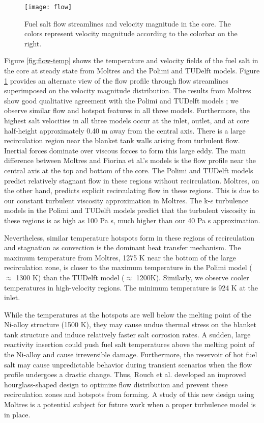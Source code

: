 \begin{figure}[t!]
    \centering
    \texttt{[image: flow]}
    \caption{Fuel salt flow streamlines and velocity magnitude in the core.
    The colors represent velocity magnitude according to the colorbar on the
    right.}
    \label{fig:flow}
\end{figure}

Figure \ref{fig:flow-temp} shows the temperature and velocity fields of the
fuel salt in the core at steady state from Moltres and the Polimi and TUDelft
models. Figure \ref{fig:flow} provides an alternate view of the flow profile
through flow streamlines superimposed on the velocity magnitude distribution.
The results from Moltres show good qualitative agreement with the
Polimi and TUDelft models \cite{fiorina_modelling_2014}; we observe similar
flow and hotspot features in all three models. Furthermore, the highest salt
velocities in all three models occur at the inlet, outlet, and at core
half-height approximately 0.40 m away from the central axis. There is a large
recirculation region near the blanket tank walls arising from turbulent flow.
Inertial forces dominate over viscous forces to form this large eddy. The main
difference between Moltres and Fiorina et al.'s models is the flow profile
near the central axis at the top and bottom of the core.
The Polimi and TUDelft models predict relatively stagnant flow in these
regions without recirculation. Moltres, on the other hand, predicts explicit
recirculating flow in these regions. This is due to our constant turbulent
viscosity approximation in Moltres. The k-$\epsilon$ turbulence models in the
Polimi and TUDelft models predict that the turbulent viscosity in these
regions is as high as 100 Pa s, much higher than our 40 Pa s approximation.

Nevertheless, similar temperature hotspots form in these regions of
recirculation and stagnation as convection is the dominant heat transfer
mechanism. The maximum temperature from Moltres, 1275 K near the bottom of the
large recirculation zone, is closer to the maximum temperature in the Polimi
model ($\approx$ 1300 K) than the TUDelft model ($\approx$ 1200K). Similarly,
we observe cooler temperatures in high-velocity regions. The minimum
temperature is 924 K at the inlet. 

While the temperatures at the hotspots are well below the melting point of the
Ni-alloy structure (1500 K), they may cause undue thermal stress on the
blanket tank structure and induce relatively faster salt corrosion rates. A
sudden, large reactivity insertion could push fuel salt temperatures above the
melting point of the Ni-alloy and cause irreversible damage. Furthermore,
the reservoir of hot fuel salt may cause unpredictable behavior during
transient scenarios when the flow profile undergoes a drastic change.
Thus, Rouch et al. \cite{rouch_preliminary_2014} developed an improved
hourglass-shaped design to optimize flow distribution and prevent these
recirculation zones and hotspots from forming. A study of this new design
using Moltres is a potential subject for future work when a proper turbulence
model is in place.

